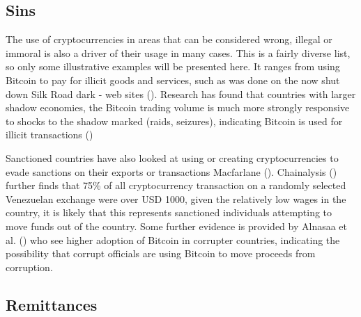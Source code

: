 \documentclass[
]{article}
\begin{document}
\subsection{Sins}\label{sins}

The use of cryptocurrencies in areas that can be considered wrong, illegal or immoral is also a driver of their usage in many cases. This is a fairly diverse list, so only some illustrative examples will be presented here. It ranges from using Bitcoin to pay for illicit goods and services, such as was done on the now shut down Silk Road dark - web sites (). Research has found that countries with larger shadow economies, the Bitcoin trading volume is much more strongly responsive to shocks to the shadow marked (raids, seizures), indicating Bitcoin is used for illicit transactions ()

Sanctioned countries have also looked at using or creating cryptocurrencies to evade sanctions on their exports or transactions Macfarlane (). Chainalysis () further finds that 75\% of all cryptocurrency transaction on a randomly selected Venezuelan exchange were over USD 1000, given the relatively low wages in the country, it is likely that this represents sanctioned individuals attempting to move funds out of the country. Some further evidence is provided by Alnasaa et al. () who see higher adoption of Bitcoin in corrupter countries, indicating the possibility that corrupt officials are using Bitcoin to move proceeds from corruption.

\subsection{Remittances}\label{remittances}
\end{document}

